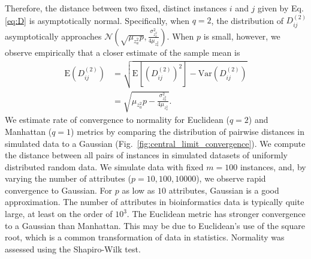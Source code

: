 \documentclass[aos]{imsart}
\begin{document}
Therefore, the distance between two fixed, distinct instances $i$ and $j$ given by Eq. \ref{eq:D} is asymptotically normal.
Specifically, when $q = 2$, the distribution of $D_{ij}^{(2)}$ asymptotically approaches $\mathcal{N}\left(\sqrt{\mu_{z^2_a}p}, \frac{\sigma^2_{z^2_a}}{4\mu_{z^2_a}}\right)$. 
When $p$ is small, however, we observe empirically that a closer estimate of the sample mean is 
%
\begin{equation}\label{eq:DqImprovedExplained}
\begin{aligned}
\text{E}\left(D^{(2)}_{ij}\right) &= \sqrt{\text{E}\left[\left(D^{(2)}_{ij}\right)^2\right] - \text{Var}\left(D^{(2)}_{ij}\right)} \\
&= \sqrt{\mu_{z^2_a}p - \frac{\sigma^2_{z^2_a}}{4\mu_{z^2_a}}}.
\end{aligned}
\end{equation}
%
We estimate rate of convergence to normality for Euclidean ($q=2$) and Manhattan ($q=1$)  metrics by comparing the distribution of pairwise distances in simulated data to a Gaussian (Fig.~\ref{fig:central_limit_convergence}). We compute the distance between all pairs of instances in simulated datasets of uniformly distributed random data. We simulate data with fixed $m=100$ instances, and, by varying the number of attributes ($p=10,100,10000$), we observe rapid convergence to Gaussian. For $p$ as low as $10$ attributes, Gaussian is a good approximation. The number of attributes in bioinformatics data is typically quite large, at least on the order of $10^3$. The Euclidean metric has stronger convergence to a Gaussian than Manhattan. This may be due to Euclidean's use of the square root, which is a common transformation of data in statistics. Normality was assessed using the Shapiro-Wilk test. 
\end{document}
